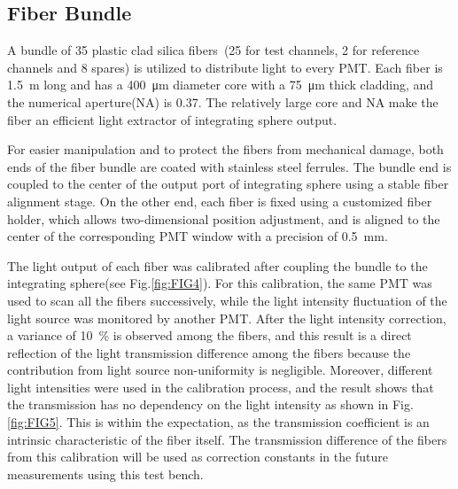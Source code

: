 \documentclass[preprint, times]{elsarticle}
\begin{document}
\subsection{Fiber Bundle}
\label{sec:fiber_bundle}

A bundle of 35 plastic clad silica fibers~\cite{optical_fibre}(25 for test channels, 2 for reference channels and 8 spares) is utilized to distribute light to every PMT.
Each fiber is \SI{1.5}{\meter} long and has a \SI{400}{\micro\meter} diameter core with a \SI{75}{\micro\meter} thick cladding, and the numerical aperture(NA) is 0.37.
The relatively large core and NA make the fiber an efficient light extractor of integrating sphere output. 

For easier manipulation and to protect the fibers from mechanical damage, both ends of the fiber bundle are coated with stainless steel ferrules.
The bundle end is coupled to the center of the output port of integrating sphere using a stable fiber alignment stage.
On the other end, each fiber is fixed using a customized fiber holder, which allows two-dimensional position adjustment, and is aligned to the center of the corresponding PMT window with a precision of \SI{0.5}{\milli\meter}.

The light output of each fiber was calibrated after coupling the bundle to the integrating sphere(see Fig.\ref{fig:FIG4}).
For this calibration, the same PMT was used to scan all the fibers successively, while the light intensity fluctuation of the light source was monitored by another PMT.
After the light intensity correction, a variance of \SI{10}{\percent} is observed among the fibers, and this result is a direct reflection of the light transmission difference among the fibers because the contribution from light source non-uniformity is negligible.
Moreover, different light intensities were used in the calibration process, and the result shows that the transmission has no dependency on the light intensity as shown in Fig.\ref{fig:FIG5}. 
This is within the expectation, as the transmission coefficient is an intrinsic characteristic of the fiber itself.
The transmission difference of the fibers from this calibration will be used as correction constants in the future measurements using this test bench.
\end{document}
